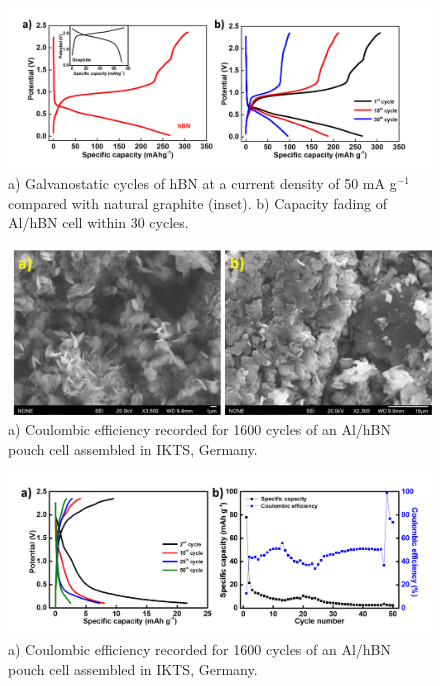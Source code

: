 \begin{figure}[tbh!]
\centering
\includegraphics[width=\textwidth]{Figures/BOhBN/hBNiniCDC}
\caption{a) Galvanostatic cycles of hBN at a current density of 50 mA g$^{-1}$ compared with natural graphite (inset). b) Capacity fading of Al/hBN cell within 30 cycles.}
\label{Figures/BOhBN:hBNiniCDC}
\end{figure}
\begin{figure}[tbh!]
\centering
\includegraphics[width=\textwidth]{Figures/BOhBN/hBNSEM}
\caption{a) Coulombic efficiency recorded for 1600 cycles of an Al/hBN pouch cell assembled in IKTS, Germany.}
\label{Figures/BOhBN:hBNSEM}
\end{figure}
\begin{figure}[tbh!]
\centering
\includegraphics[width=\textwidth]{Figures/BOhBN/BNNSCDCCE}
\caption{a) Coulombic efficiency recorded for 1600 cycles of an Al/hBN pouch cell assembled in IKTS, Germany.}
\label{Figures/BOhBN:hBNCDCCE}
\end{figure}
